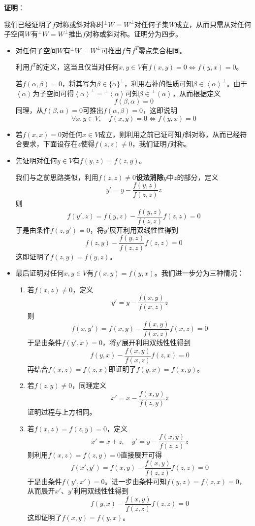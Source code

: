 \documentclass[a4paper,UTF8,fontset=windows,AutoFakeBold]{ctexart}
\newcommand*{\note}{\noindent *}
\newcommand{\proo}[1]{{\vspace{5pt}\kaishu\noindent\textbf{证明}：\vspace{-3pt}
\begin{compactitem}
    \item[] #1
\end{compactitem}
}}
\begin{document}
\proo{
    我们已经证明了$f$对称或斜对称时$^\bot W=W^\bot$对任何子集$W$成立，从而只需从对任何子空间$W$有$^\bot W=W^\bot$推出$f$对称或斜对称。证明分为四步。

    \begin{itemize}
        \item 对任何子空间$W$有$^\bot W=W^\bot$可推出$f$与$f^T$零点集合相同。
        
        \note 利用$f^T$的定义，这当且仅当对任何$x,y\in V$有$f(x,y)=0\Leftrightarrow f(y,x)=0$。

        若$f(\alpha,\beta)=0$，将其写为$\beta\in\{\alpha\}^\bot$，利用右补的性质可知$\beta\in\left<\alpha\right>^\bot$。由于$\left<\alpha\right>$为子空间可得$\left<\alpha\right>^\bot={}^\bot\left<\alpha\right>$可知$\beta\in{}^\bot\left<\alpha\right>$，从而根据定义
        $$f(\beta,\alpha)=0$$
        同理，从$f(\beta,\alpha)=0$可推出$f(\alpha,\beta)=0$，这即说明$$\forall x,y\in V,\quad f(x,y)=0\Leftrightarrow f(y,x)=0$$

        \item 若$f(x,x)=0$对任何$x\in V$成立，则利用之前已证可知$f$斜对称，从而已经符合要求，下面设存在$z$使得$f(z,z)\ne0$，我们证明$f$对称。
        
        \item 先证明对任何$y\in V$有$f(y,z)=f(z,y)$。
        
        我们与之前思路类似，利用$f(z,z)\ne0$\textbf{设法消除}$y$中$z$的部分，定义
        $$y'=y-\frac{f(y,z)}{f(z,z)}z$$
        则
        $$f(y',z)=f(y,z)-\frac{f(y,z)}{f(z,z)}f(z,z)=0$$
        于是由条件$f(z,y')=0$，将$y'$展开利用双线性性得到
        $$f(z,y)-\frac{f(y,z)}{f(z,z)}f(z,z)=0$$
        这即证明了$f(z,y)=f(y,z)$。

        \item 最后证明对任何$x,y\in V$有$f(x,y)=f(y,x)$。我们进一步分为三种情况：
        \begin{enumerate}
            \item 若$f(x,z)\ne0$，定义
            $$y'=y-\frac{f(x,y)}{f(x,z)}z$$
            则
            $$f(x,y')=f(x,y)-\frac{f(x,y)}{f(x,z)}f(x,z)=0$$
            于是由条件$f(y',x)=0$，将$y'$展开利用双线性性得到
            $$f(y,x)-\frac{f(x,y)}{f(x,z)}f(z,x)=0$$
            再结合$f(x,z)=f(z,x)$即证明了$f(y,x)=f(x,y)$。

            \item 若$f(z,y)\ne0$，同理定义
            $$x'=x-\frac{f(x,y)}{f(z,y)}z$$
            证明过程与上方相同。

            \item 若$f(x,z)=f(z,y)=0$，定义
            $$x'=x+z,\quad y'=y-\frac{f(x,y)}{f(z,z)}z$$
            则利用$f(x,z)=f(z,y)=0$直接展开可得
            $$f(x',y')=f(x,y)-\frac{f(x,y)}{f(z,z)}f(z,z)=0$$
            于是由条件$f(y',x')=0$。进一步由条件可知$f(y,z)=f(z,x)=0$，从而展开$x'$、$y'$利用双线性性得到
            $$f(y,x)-\frac{f(x,y)}{f(z,z)}f(z,z)=0$$
            这即证明了$f(x,y)=f(y,x)$。
        \end{enumerate}
    \end{itemize}

}
\end{document}
